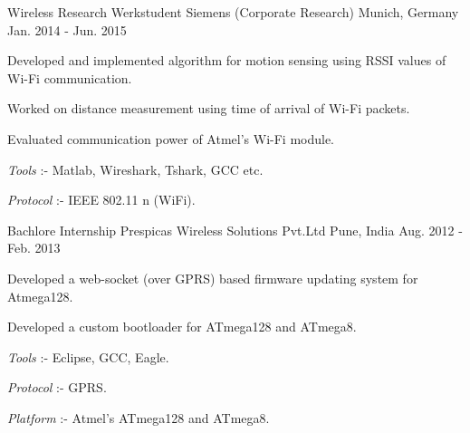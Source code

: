 \begin{cventries}
  \cventry
    {Wireless Research Werkstudent} %
    {Siemens (Corporate Research)} %
    {Munich, Germany} %
    {Jan. 2014 - Jun. 2015} %
    {
      \begin{cvitems} %
        \item {Developed and implemented algorithm for motion sensing using RSSI values of Wi-Fi communication.}
        \item {Worked on distance measurement using time of arrival of Wi-Fi packets.}
        \item {Evaluated communication power of Atmel's Wi-Fi module.}
        \item {\textit{Tools} :- Matlab, Wireshark, Tshark, GCC etc.}
        \item {\textit{Protocol} :- IEEE 802.11 n (WiFi).}
      \end{cvitems}
    }
\cventry
    {Bachlore Internship} %
    {Prespicas Wireless Solutions Pvt.Ltd} %
    {Pune, India} %
    {Aug. 2012 - Feb. 2013} %
    {
      \begin{cvitems} %
        \item {Developed a web-socket (over GPRS) based firmware updating system for Atmega128.}
        \item {Developed a custom bootloader for ATmega128 and ATmega8.}
        \item {\textit{Tools} :- Eclipse, GCC, Eagle.}
        \item {\textit{Protocol} :- GPRS.}
        \item {\textit{Platform} :- Atmel's ATmega128 and ATmega8.}
      \end{cvitems}
    }    
\end{cventries}
